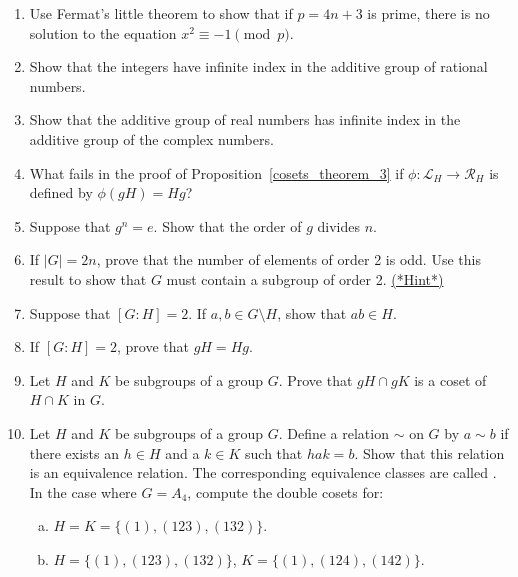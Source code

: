 {{\begin{enumerate}
\begin{enumerate}
 \item
Let $N$ be  a normal subgroup of $G$.  Prove that $G/N$ is abelian if
and only if $N$ contains the commutator subgroup of $G$.
 
\end{enumerate}

\item
Use Fermat's little theorem to show that if $p= 4n+3$ is prime, there is no solution to the equation $x^2 \equiv -1 \pmod{p}$.
 
\item
Show that the integers have infinite index in the additive group of rational numbers.
 
\item
Show that the additive group of real numbers has infinite index in the additive group of the complex numbers.
 
 
\item
What fails in the proof of Proposition~\ref{cosets_theorem_3} if $\phi :  {\mathcal L}_H \rightarrow {\mathcal R}_H$ is defined by $\phi( gH ) = Hg$?
 
\item
Suppose that $g^n = e$. Show that the order of $g$ divides
$n$.
 

\item \label{eoc:cosets:1}
If $|G| = 2n$, prove that the number of elements of order 2 is odd.  Use this result to show that $G$ must contain a subgroup of order 2.
\hyperref[sec:cosets:hints]{(*Hint*)}

\item
Suppose that $[G : H] = 2$. If $a, b \in G \setminus H$, show that $ab \in H$.

\item
If $[G : H] = 2$, prove that $gH = Hg$.

\item
Let $H$ and $K$ be subgroups of a group $G$.  Prove that $gH \cap gK$ is a coset of $H \cap K$ in $G$.  
 
\item
Let $H$ and $K$ be subgroups of a group $G$.  Define a relation $\sim$ on $G$ by $a \sim b$ if there exists an $h \in H$ and a $k \in K$ such that $hak = b$.  Show that this relation is an equivalence relation.  The corresponding equivalence classes are called .  In the case where $G = A_4$, compute the double cosets for:
\begin{enumerate}[(a)]
\item
$H = K =  \{ (1),(123), (132) \}$.
\item
$H  =  \{ (1),(123), (132) \}$, $K  =  \{ (1),(124), (142) \}$. 
\end{enumerate}
 

\end{enumerate}}}
